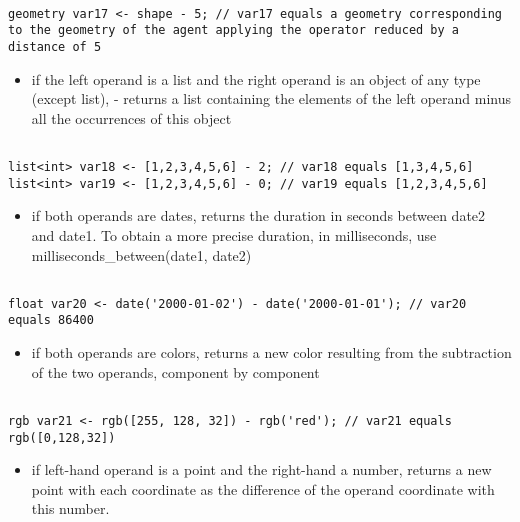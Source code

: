 \documentclass[]{book}
\providecommand{\tightlist}{%
  \setlength{\itemsep}{0pt}\setlength{\parskip}{0pt}}
\theoremstyle{definition}
\theoremstyle{definition}
\theoremstyle{definition}
\theoremstyle{remark}
\begin{document}
\begin{verbatim}
 
geometry var17 <- shape - 5; // var17 equals a geometry corresponding to the geometry of the agent applying the operator reduced by a distance of 5
\end{verbatim}

\begin{itemize}
\tightlist
\item
  if the left operand is a list and the right operand is an object of
  any type (except list), - returns a list containing the elements of
  the left operand minus all the occurrences of this object
\end{itemize}

\begin{verbatim}
 
list<int> var18 <- [1,2,3,4,5,6] - 2; // var18 equals [1,3,4,5,6] 
list<int> var19 <- [1,2,3,4,5,6] - 0; // var19 equals [1,2,3,4,5,6]
\end{verbatim}

\begin{itemize}
\tightlist
\item
  if both operands are dates, returns the duration in seconds between
  date2 and date1. To obtain a more precise duration, in milliseconds,
  use milliseconds\_between(date1, date2)
\end{itemize}

\begin{verbatim}
 
float var20 <- date('2000-01-02') - date('2000-01-01'); // var20 equals 86400
\end{verbatim}

\begin{itemize}
\tightlist
\item
  if both operands are colors, returns a new color resulting from the
  subtraction of the two operands, component by component
\end{itemize}

\begin{verbatim}
 
rgb var21 <- rgb([255, 128, 32]) - rgb('red'); // var21 equals rgb([0,128,32])
\end{verbatim}

\begin{itemize}
\tightlist
\item
  if left-hand operand is a point and the right-hand a number, returns a
  new point with each coordinate as the difference of the operand
  coordinate with this number.
\end{itemize}
\end{document}

